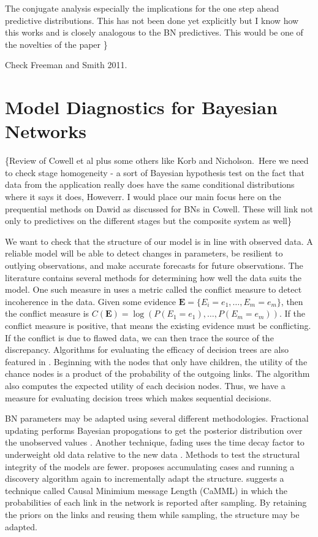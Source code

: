 \documentclass[12pt]{article}
\begin{document}
 The conjugate analysis especially the implications for the one step
ahead predictive distributions. This has not been done yet explicitly but I
know how this works and is closely analogous to the BN predictives. This
would be one of the novelties of the paper \}

Check Freeman and Smith 2011.



\section{Model Diagnostics for Bayesian Networks}

\{Review of Cowell et al plus some others like Korb and Nicholson.\ Here we
need to check stage homogeneity - a sort of Bayesian hypothesis test on the
fact that data from the application really does have the same conditional
distributions where it says it does, Howeverr. I would place our main focus
here on the prequential methods on Dawid as discussed for BNs in Cowell.
These will link not only to predictives on the different stages but the
composite system as well\}

We want to check that the structure of our model is in line with observed data. A reliable model will be able to detect changes in parameters, be resilient to outlying observations, and make accurate forecasts for future observations\cite{Dawid1984}. The literature contains several methods for determining how well the data suits the model. One such measure in \cite{KORB} uses a metric called the conflict measure to detect incoherence in the data. Given some evidence $\bm{E}=\{E_i=e_1,\ldots,E_m=e_m\}$, then the conflict measure is $C(\bm{E})=\log(P(E_1=e_1),\ldots,P(E_m=e_m))$. If the conflict measure is positive, that means the existing evidence must be conflicting. If the conflict is due to flawed data, we can then trace the source of the discrepancy. Algorithms for evaluating the efficacy of decision trees are also featured in \cite{KORB}. Beginning with the nodes that only have children, the utility of the chance nodes is a product of the probability of the outgoing links. The algorithm also computes the expected utility of each decision nodes. Thus, we have a measure for evaluating decision trees which makes sequential decisions. 

BN parameters may be adapted using several different methodologies. Fractional updating performs Bayesian propogations to get the posterior distribution over the unobserved values \cite{Spiegelhalter and Lauritzen}%
. Another technique, fading uses the time decay factor to underweight old data relative to the new data \cite{JENSEN}. Methods to test the structural integrity of the models are fewer. \cite{JENSEN} proposes accumulating cases and running a discovery algorithm again to incrementally adapt the structure. \cite{KORB} suggests a technique called Causal Minimium message Length (CaMML) in which the probabilities of each link in the network is reported after sampling. By retaining the priors on the links and reusing them while sampling, the structure may be adapted. 
\end{document}
